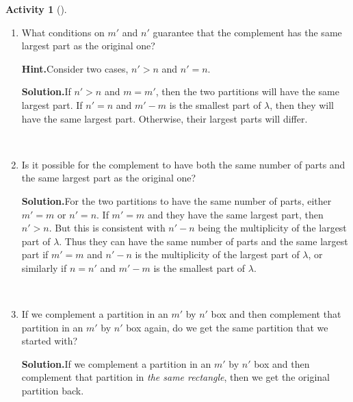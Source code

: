 \documentclass[10pt,]{book}
\theoremstyle{plain}
\theoremstyle{definition}
\newtheorem{activity}[project]{Activity}
\numberwithin{equation}{chapter}
\newcommand{\gt}{>}
\begin{document}
\begin{activity}[]
\begin{enumerate}[label=(\alph*)]
~\par
\item What conditions on \(m'\) and \(n'\) guarantee that the complement has the same largest part as the original one?%
\par\medskip\noindent%
\textbf{Hint.}\quad Consider two cases, \(n' \gt n\) and \(n' = n\).%
\par\medskip\noindent%
\textbf{Solution.}\quad If \(n'\gt n\) and \(m=m'\), then the two partitions will have the same largest part. If \(n'=n\) and \(m'-m\) is the smallest part of \(\lambda\), then they will have the same largest part. Otherwise, their largest parts will differ.%

~\par
\item Is it possible for the complement to have both the same number of parts and the same largest part as the original one?%
\par\medskip\noindent%
\textbf{Solution.}\quad For the two partitions to have the same number of parts, either \(m'=m\) or \(n'=n\). If \(m'=m\) and they have the same largest part, then \(n'>n\). But this is consistent with \(n'-n\) being the multiplicity of the largest part of \(\lambda\). Thus they can have the same number of parts and the same largest part if \(m'=m\) and \(n'-n\) is the multiplicity of the largest part of \(\lambda\), or similarly if \(n=n'\) and \(m'-m\) is the smallest part of \(\lambda\).%

~\par
\item If we complement a partition in an \(m'\) by \(n'\) box and then complement that partition in an \(m'\) by \(n'\) box again, do we get the same partition that we started with?%
\par\medskip\noindent%
\textbf{Solution.}\quad If we complement a partition in an \(m'\) by \(n'\) box and then complement that partition in \emph{the same rectangle}, then we get the original partition back.%

\end{enumerate}
\end{activity}
\end{document}

